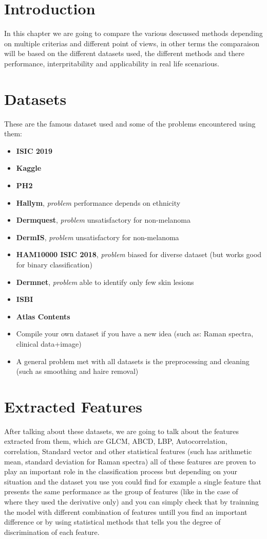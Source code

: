 \section{Introduction}
In this chapter we are going to compare the various descussed methods  depending on multiple criterias and different point of views, in other terms the comparaison will be based on the different datasets used, the different methods and there performance, interpritability and applicability in real life scenarious.

\section{Datasets}
    These are the famous dataset used and some of the problems encountered using them:\\ 
    \begin{itemize}
    \item \textbf{ISIC 2019}
    \item \textbf{Kaggle}
    \item \textbf{PH2}
    \item \textbf{Hallym}, \emph{problem} performance depends on ethnicity
    \item \textbf{Dermquest}, \emph{problem} unsatisfactory for non-melanoma
    \item \textbf{DermIS}, \emph{problem} unsatisfactory for non-melanoma
    \item \textbf{HAM10000 ISIC 2018}, \emph{problem} biased for diverse dataset (but works good for binary classification)
    \item \textbf{Dermnet}, \emph{problem} able to identify only few skin lesions
    \item \textbf{ISBI}
    \item \textbf{Atlas Contents}
    \item Compile your own dataset if you have a new idea (such as: Raman spectra, clinical data+image)
    \item A general problem met with all datasets is the preprocessing and cleaning (such as smoothing and haire removal)
\end{itemize}


\section{Extracted Features}
    After talking about these datasets, we are going to talk about the features extracted from them, which are GLCM, ABCD, LBP, Autocorrelation, correlation, Standard vector and other statistical features (such has arithmetic mean, standard deviation for Raman spectra) all of these features are proven to play an important role in the classification process but depending on your situation and the dataset you use you could find for example a single feature that presents the same performance as the group of features (like in the case of ~\cite{Daniella2021} where they used the derivative only) and you can simply check that by trainning the model with different combination of features untill you find an important difference or by using statistical methods that tells you the degree of discrimination of each feature.

